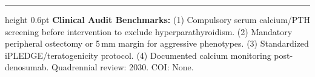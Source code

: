 \documentclass[9pt,a4paper]{article}
\begin{document}
\vspace{5pt}
\hrule height 0.6pt\vspace{3pt}
\footnotesize\textbf{Clinical Audit Benchmarks:} (1) Compulsory serum calcium/PTH screening before intervention to exclude hyperparathyroidism. (2) Mandatory peripheral ostectomy or 5\,mm margin for aggressive phenotypes. (3) Standardized iPLEDGE/teratogenicity protocol. (4) Documented calcium monitoring post-denosumab. Quadrennial review: 2030. COI: None.
\end{document}
